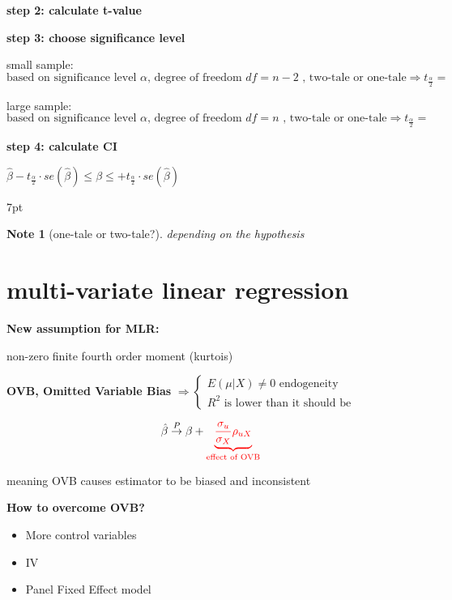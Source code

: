 \documentclass{article}
\providecommand{\tightlist}{
  \setlength{\itemsep}{0pt}
  \setlength{\parskip}{0pt}}
\newenvironment{blueblock}{
\def\FrameCommand{
  \hspace{1pt}
    {\color{DarkBlue}
    \vrule width 2pt}
    {\color{blueshade}
    \vrule width 4pt}
  \colorbox{blueshade}
}
\MakeFramed{
  \advance
  \hsize-
  \width
  \FrameRestore}
\noindent\hspace{-4.55pt}%
\begin{adjustwidth}{}{7pt}
\vspace{2pt}\vspace{2pt}
}
{\vspace{2pt}\end{adjustwidth}\endMakeFramed}
\newtheorem{note}{Note}
\begin{document}
\textbf{step 2: calculate t-value}

\textbf{step 3: choose significance level}

small sample: $\text{based on significance level $\alpha$, degree of freedom $df=n-2$ , two-tale or one-tale} \Rightarrow t_{\frac{\alpha}{2}}=$

large sample: $\text{based on significance level $\alpha$, degree of freedom $df=n$ , two-tale or one-tale} \Rightarrow t_{\frac{\alpha}{2}}=$

\textbf{step 4: calculate CI}

$\hat{\beta}-t_{\frac{\alpha}{2}} \cdot se(\hat{\beta})\leqslant \beta \leqslant+t_{\frac{\alpha}{2}} \cdot se(\hat{\beta})$

\begin{blueblock}
\begin{note}[one-tale or two-tale?]
depending on the hypothesis
\end{note}
\end{blueblock}



\section{multi-variate linear regression} %
\label{sec:multi_variate_linear_regression}

\textbf{New assumption for MLR:}

non-zero finite fourth order moment (kurtois)


\textbf{OVB, Omitted Variable Bias }
$\Rightarrow 
\begin{cases}
  E(\mu|X)\neq 0 \text{ endogeneity}  
  \\
  R^2 \text{ is lower than it should be} 
\end{cases}$

\begin{equation}
  \hat{\beta}\stackrel{P}{\rightarrow}\beta+
  \color{red}
  \underbrace{\frac{\sigma_u}{\sigma_X}\rho_{uX}}_{\text{effect of OVB}}
\end{equation}

meaning OVB causes estimator to be biased and inconsistent

\textbf{How to overcome OVB?}
\begin{itemize}
\tightlist
  \item More control variables
  \item IV
  \item Panel Fixed Effect model
\end{itemize}
\end{document}
